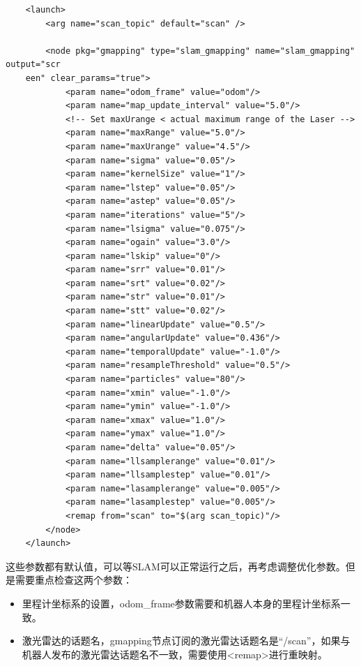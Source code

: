 \documentclass[10pt, oneside]{book}
\begin{document}
\begin{verbatim}
    <launch>
        <arg name="scan_topic" default="scan" />

        <node pkg="gmapping" type="slam_gmapping" name="slam_gmapping" output="scr
    een" clear_params="true">
            <param name="odom_frame" value="odom"/>
            <param name="map_update_interval" value="5.0"/>
            <!-- Set maxUrange < actual maximum range of the Laser -->
            <param name="maxRange" value="5.0"/>
            <param name="maxUrange" value="4.5"/>
            <param name="sigma" value="0.05"/>
            <param name="kernelSize" value="1"/>
            <param name="lstep" value="0.05"/>
            <param name="astep" value="0.05"/>
            <param name="iterations" value="5"/>
            <param name="lsigma" value="0.075"/>
            <param name="ogain" value="3.0"/>
            <param name="lskip" value="0"/>
            <param name="srr" value="0.01"/>
            <param name="srt" value="0.02"/>
            <param name="str" value="0.01"/>
            <param name="stt" value="0.02"/>
            <param name="linearUpdate" value="0.5"/>
            <param name="angularUpdate" value="0.436"/>
            <param name="temporalUpdate" value="-1.0"/>
            <param name="resampleThreshold" value="0.5"/>
            <param name="particles" value="80"/>
            <param name="xmin" value="-1.0"/>
            <param name="ymin" value="-1.0"/>
            <param name="xmax" value="1.0"/>
            <param name="ymax" value="1.0"/>
            <param name="delta" value="0.05"/>
            <param name="llsamplerange" value="0.01"/>
            <param name="llsamplestep" value="0.01"/>
            <param name="lasamplerange" value="0.005"/>
            <param name="lasamplestep" value="0.005"/>
            <remap from="scan" to="$(arg scan_topic)"/>
        </node>
    </launch>
\end{verbatim}

这些参数都有默认值，可以等SLAM可以正常运行之后，再考虑调整优化参数。但是需要重点检查这两个参数：

\begin{itemize}
    \item 里程计坐标系的设置，odom\_frame参数需要和机器人本身的里程计坐标系一致。
    \item 激光雷达的话题名，gmapping节点订阅的激光雷达话题名是“/scan”，如果与机器人发布的激光雷达话题名不一致，需要使用<remap>进行重映射。
\end{itemize}
\end{document}
